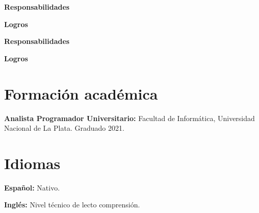 \documentclass[10pt,a4paper]{article}
\begin{document}
	\noindent\textbf{Responsabilidades}
	
	\noindent\textbf{Logros}
	
	
	\noindent\textbf{Responsabilidades}
	
	\noindent\textbf{Logros}





	\section{Formación académica} {
		\setlength{\parindent}{0pt}
		
		\textbf{Analista Programador Universitario:} Facultad de Informática, Universidad Nacional de La Plata. Graduado 2021.
	}
	
	
	\section{Idiomas} {
		\setlength{\parindent}{0pt}
		
		\textbf{Español:} Nativo.
		
		\textbf{Inglés:} Nivel técnico de lecto comprensión.
	}
	
\end{document}
